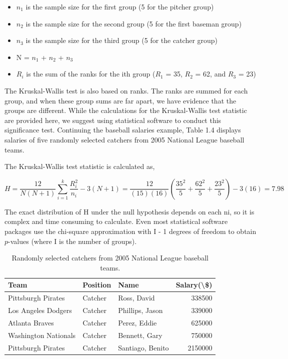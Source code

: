 \documentclass[
]{report}
\providecommand{\tightlist}{%
  \setlength{\itemsep}{0pt}\setlength{\parskip}{0pt}}
\begin{document}
\begin{itemize}
\tightlist
\item
  \(\scriptstyle n_1\) is the sample size for the first group (5 for the pitcher group)
\item
  \(\scriptstyle n_2\) is the sample size for the second group (5 for the first baseman group)
\item
  \(\scriptstyle n_3\) is the sample size for the third group (5 for the catcher group)
\item
  N = \(\scriptstyle n_1\) + \(\scriptstyle n_2\) + \(\scriptstyle n_3\)
\item
  \(\scriptstyle R_i\) is the sum of the ranks for the ith group (\(\scriptstyle R_1\) = 35, \(\scriptstyle R_2\) = 62, and \(\scriptstyle R_3\) = 23)
\end{itemize}

The Kruskal-Wallis test is also based on ranks. The ranks are summed for each group, and when these group sums are far apart, we have evidence that the groups are different. While the calculations for the Kruskal-Wallis test statistic are provided here, we suggest using statistical software to conduct this significance test. Continuing the baseball salaries example, Table 1.4 displays salaries of five randomly selected catchers from 2005 National League baseball teams.

The Kruskal-Wallis test statistic is calculated as,

\begin{equation} 
  H = \frac{12}{N(N + 1)} \sum_{i=1}^k \frac{R_i^2}{n_i} - 3(N + 1) = \frac{12}{(15)(16)}(\frac{35^2}{5}+\frac{62^2}{5}+\frac{23^2}{5}) -3(16) =7.98
  \tag{1.5} \label{eq:1_5}
\end{equation}

The exact distribution of H under the null hypothesis depends on each ni, so it is complex and time consuming to calculate. Even most statistical software packages use the chi-square approximation with I - 1 degrees of freedom to obtain \(\scriptstyle p\)-values (where I is the number of groups).

\begin{table}

\caption{\label{tab:table4}Randomly selected catchers from 2005 National League baseball teams.}
\centering
\begin{tabular}[t]{lllr}
\toprule
Team & Position & Name & Salary(\textbackslash{}\$)\\
\midrule
Pittsburgh Pirates & Catcher & Ross, David & 338500\\
Los Angeles Dodgers & Catcher & Phillips, Jason & 339000\\
Atlanta Braves & Catcher & Perez, Eddie & 625000\\
Washington Nationals & Catcher & Bennett, Gary & 750000\\
Pittsburgh Pirates & Catcher & Santiago, Benito & 2150000\\
\bottomrule
\end{tabular}
\end{table}
\end{document}
